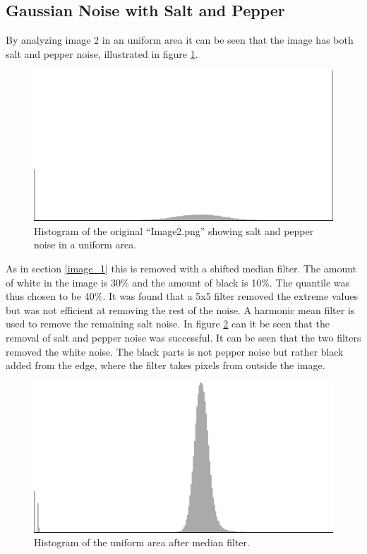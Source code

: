 \subsection{Gaussian Noise with Salt and Pepper}

By analyzing image 2 in an uniform area it can be seen that the image has both salt and pepper noise, illustrated in figure \ref{fig:hist2_uniform}.

\begin{figure}[H]
\centering
\includegraphics[width = \histogramWidth]{graphics/hist2_uniform.png}
\caption{Histogram of the original ``Image2.png'' showing salt and pepper noise in a uniform area.}
\label{fig:hist2_uniform}
\end{figure}

As in section \ref{image_1} this is removed with a shifted median filter.
The amount of white in the image is 30\% and the amount of black is 10\%.
The quantile was thus chosen to be 40\%.
It was found that a 5x5 filter removed the extreme values but was not efficient at removing the rest of the noise.
A harmonic mean filter is used to remove the remaining salt noise.
In figure \ref{fig:hist2_median_harmonic} can it be seen that the removal of salt and pepper noise was successful.
It can be seen that the two filters removed the white noise.
The black parts is not pepper noise but rather black added from the edge, where the filter takes pixels from outside the image.

\begin{figure}[H]
\centering
\includegraphics[width = \histogramWidth]{graphics/hist2_after_median.png}
\caption{Histogram of the uniform area after median filter.}
\label{fig:hist2_median_harmonic}
\end{figure}

